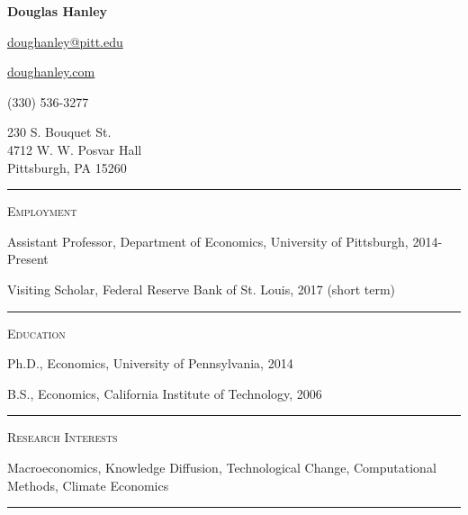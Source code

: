 \documentclass{article}
\begin{document}
\thispagestyle{empty}

\begin{center}
{\LARGE \textbf{Douglas Hanley}}
\end{center}

\begin{center}
\parbox{2.0in}{
\begin{flushright}
\href{mailto:doughanley@pitt.edu}{doughanley@pitt.edu} 

\href{http://doughanley.com/}{doughanley.com} 

(330) 536-3277
\end{flushright}
}
\hspace{0.5cm}
\parbox{2.0in}{
230 S. Bouquet St. \\
4712 W. W. Posvar Hall \\
Pittsburgh, PA 15260
}
\end{center}

\hspace{-0.025\textwidth}\rule{1.05\textwidth}{0.1mm}

\vspace{0.3cm}


\parbox{\textwidth}{
\parbox[t]{0.28\textwidth}{ \raggedright \noindent \textsc{ Employment } }
\parbox[t]{0.72\textwidth}{ \raggedright

Assistant Professor, Department of Economics, University of Pittsburgh, 2014-Present
\vspace{0.27cm}

Visiting Scholar, Federal Reserve Bank of St. Louis, 2017 (short term)
\vspace{0.27cm}

}
\textcolor{light-gray}{\hrule}
}
\vspace{0.3cm}

\parbox{\textwidth}{
\parbox[t]{0.28\textwidth}{ \raggedright \noindent \textsc{ Education } }
\parbox[t]{0.72\textwidth}{ \raggedright

Ph.D., Economics, University of Pennsylvania, 2014
\vspace{0.27cm}

B.S., Economics, California Institute of Technology, 2006
\vspace{0.27cm}

}
\textcolor{light-gray}{\hrule}
}
\vspace{0.3cm}

\parbox{\textwidth}{
\parbox[t]{0.28\textwidth}{ \raggedright \noindent \textsc{ Research Interests } }
\parbox[t]{0.72\textwidth}{ \raggedright

Macroeconomics, Knowledge Diffusion, Technological Change, Computational Methods, Climate Economics
\vspace{0.27cm}

}
\textcolor{light-gray}{\hrule}
}
\vspace{0.3cm}
\end{document}

